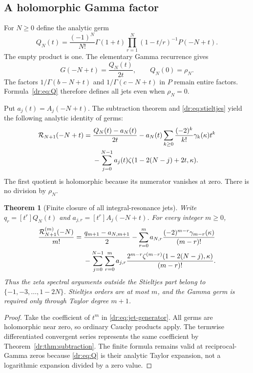 \documentclass[11pt,letterpaper]{article}
\numberwithin{equation}{section}
\newtheorem{theorem}{Theorem}[section]
\theoremstyle{definition}
\theoremstyle{remark}
\newcommand{\Rcal}{\mathcal R}
\begin{document}
\subsection{A holomorphic Gamma factor}

For $N\geq0$ define the analytic germ
\begin{equation}
 Q_N(t)=\frac{(-1)^N}{N!}\Gamma(1+t)
       \prod_{r=1}^N(1-t/r)^{-1}P(-N+t).
 \label{dr:eq:Q}
\end{equation}
The empty product is one. The elementary Gamma recurrence gives
\begin{equation}
 G(-N+t)=\frac{Q_N(t)}{2t},\qquad Q_N(0)=\rho_N.
 \label{dr:eq:Q-identity}
\end{equation}
The factors $1/\Gamma(b-N+t)$ and $1/\Gamma(c-N+t)$ in $P$ remain
entire factors. Formula~\eqref{dr:eq:Q} therefore defines all jets even
when $\rho_N=0$.

Put $a_j(t)=A_j(-N+t)$. The subtraction theorem and
\eqref{dr:eq:stieltjes} yield the following analytic identity of germs:
\begin{align}
 \Rcal_{N+1}(-N+t)={}&\frac{Q_N(t)-a_N(t)}{2t}
 -a_N(t)\sum_{k\geq0}\frac{(-2)^k}{k!}\gamma_k(\kappa)t^k\notag\\
 &-\sum_{j=0}^{N-1}a_j(t)
              \zeta(1-2(N-j)+2t,\kappa).
 \label{dr:eq:jet-generator}
\end{align}
The first quotient is holomorphic because its numerator vanishes at zero.
There is no division by $\rho_N$.

\begin{theorem}[Finite closure of all integral-resonance jets]
\label{dr:thm:jets}
Write $q_r=[t^r]Q_N(t)$ and $a_{j,r}=[t^r]A_j(-N+t)$.
For every integer $m\geq0$,
\begin{align}
 \frac{\Rcal_{N+1}^{(m)}(-N)}{m!}
 ={}&\frac{q_{m+1}-a_{N,m+1}}2
 -\sum_{r=0}^m a_{N,r}
                 \frac{(-2)^{m-r}\gamma_{m-r}(\kappa)}{(m-r)!}
                 \notag\\
 &-\sum_{j=0}^{N-1}\sum_{r=0}^m a_{j,r}
    \frac{2^{m-r}\zeta^{(m-r)}(1-2(N-j),\kappa)}{(m-r)!}.
 \label{dr:eq:all-jets}
\end{align}
Thus the zeta spectral arguments outside the Stieltjes part belong to
$\{-1,-3,\ldots,1-2N\}$. Stieltjes orders are at most $m$, and the
Gamma germ is required only through Taylor degree $m+1$.
\end{theorem}

\begin{proof}
Take the coefficient of $t^m$ in \eqref{dr:eq:jet-generator}. All germs
are holomorphic near zero, so ordinary Cauchy products apply. The
termwise differentiated convergent series represents the same coefficient
by Theorem~\ref{dr:thm:subtraction}. The finite formula remains valid at
reciprocal-Gamma zeros because \eqref{dr:eq:Q} is their analytic Taylor
expansion, not a logarithmic expansion divided by a zero value.
\end{proof}
\end{document}
